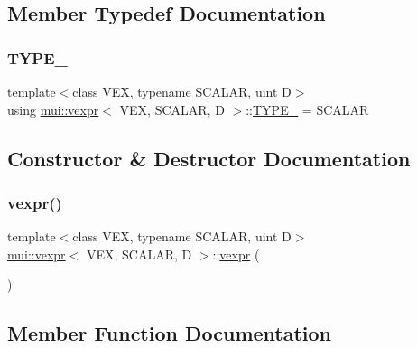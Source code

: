 \subsection{Member Typedef Documentation}
\mbox{\label{structmui_1_1vexpr_a496707e81396551f39f8361b952c2e54}} 
\subsubsection{\texorpdfstring{T\+Y\+P\+E\+\_\+}{TYPE\_}}
{\footnotesize\ttfamily template$<$class V\+EX, typename S\+C\+A\+L\+AR, uint D$>$ \\
using \hyperlink{structmui_1_1vexpr}{mui\+::vexpr}$<$ V\+EX, S\+C\+A\+L\+AR, D $>$\+::\hyperlink{structmui_1_1vexpr_a496707e81396551f39f8361b952c2e54}{T\+Y\+P\+E\+\_\+} =  S\+C\+A\+L\+AR}



\subsection{Constructor \& Destructor Documentation}
\mbox{\label{structmui_1_1vexpr_a947119cd55ee5d64647810ba1c9386fe}} 
\subsubsection{\texorpdfstring{vexpr()}{vexpr()}}
{\footnotesize\ttfamily template$<$class V\+EX, typename S\+C\+A\+L\+AR, uint D$>$ \\
\hyperlink{structmui_1_1vexpr}{mui\+::vexpr}$<$ V\+EX, S\+C\+A\+L\+AR, D $>$\+::\hyperlink{structmui_1_1vexpr}{vexpr} (\begin{DoxyParamCaption}{ }\end{DoxyParamCaption})\hspace{0.3cm}{\ttfamily [inline]}}



\subsection{Member Function Documentation}
\mbox{\label{structmui_1_1vexpr_a9e9ab82899a0221b4018c1eaf750e84d}} 
